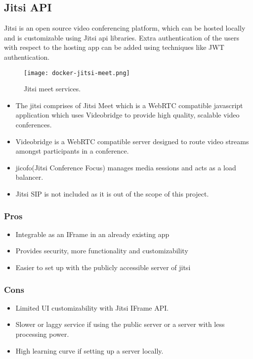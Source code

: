 \subsection{Jitsi API}
Jitsi is an open source video conferencing platform, which can be hosted locally and is customizable using Jitsi api libraries.
Extra authentication of the users with respect to the hosting app can be added using techniques like JWT authentication.

\begin{figure}[h!]
    \begin{center}
        \texttt{[image: docker-jitsi-meet.png]}
    \end{center}
    \caption{Jitsi meet services.}
    \label{fig:jitsimeet}
\end{figure}

\begin{itemize}
    \item The jitsi comprises of Jitsi Meet which is a WebRTC compatible javascript application which uses Videobridge to provide high quality, scalable video conferences.
    \item Videobridge is a WebRTC compatible server designed to route video streams amongst participants in a conference.
    \item jicofo(Jitsi Conference Focus) manages media sessions and acts as a load balancer.
    \item Jitsi SIP is not included as it is out of the scope of this project.
\end{itemize}

\subsubsection{Pros}

\begin{itemize}
    \item Integrable as an IFrame in an already existing app
    \item Provides security, more functionality and customizability 
    \item Easier to set up with the publicly accessible server of jitsi
\end{itemize}

\subsubsection{Cons}

\begin{itemize}
    \item Limited UI customizability with Jitsi IFrame API.
    \item Slower or laggy service if using the public server or a server with less processing power.
    \item High learning curve if setting up a server locally.
\end{itemize}






